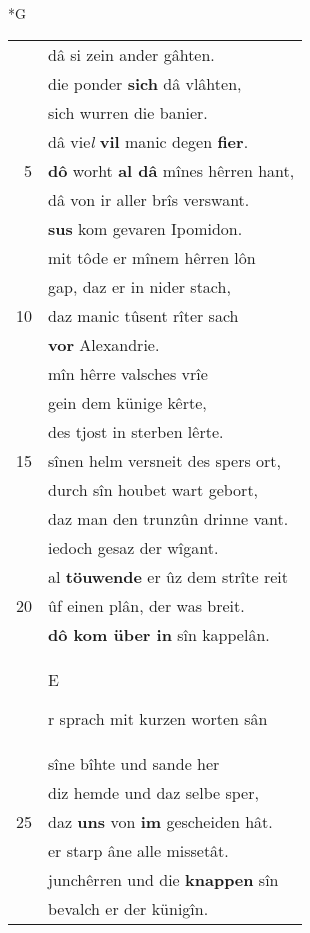 \documentclass[8pt,a4paper,notitlepage]{article}
\begin{document}
\begin{table}[ht]
\begin{minipage}[t]{0.5\linewidth}
\small
\begin{center}*G
\end{center}
\begin{tabular}{rl}
 & dâ si zein ander gâhten.\\ 
 & die ponder \textbf{sich} dâ vlâhten,\\ 
 & sich wurren die banier.\\ 
 & dâ vie\textit{l} \textbf{vil} manic degen \textbf{fier}.\\ 
5 & \textbf{dô} worht \textbf{al dâ} mînes hêrren hant,\\ 
 & dâ von ir aller brîs verswant.\\ 
 & \textbf{sus} kom gevaren Ipomidon.\\ 
 & mit tôde er mînem hêrren lôn\\ 
 & gap, daz er in nider stach,\\ 
10 & daz manic tûsent rîter sach\\ 
 & \textbf{vor} Alexandrie.\\ 
 & mîn hêrre valsches vrîe\\ 
 & gein dem künige kêrte,\\ 
 & des tjost in sterben lêrte.\\ 
15 & sînen helm versneit des spers ort,\\ 
 & durch sîn houbet wart gebort,\\ 
 & daz man den trunzûn drinne vant.\\ 
 & iedoch gesaz der wîgant.\\ 
 & al \textbf{töuwende} er ûz dem strîte reit\\ 
20 & ûf einen plân, der was breit.\\ 
 & \textbf{dô kom über in} sîn kappelân.\\ 
 & \begin{large}E\end{large}r sprach mit kurzen worten sân\\ 
 & sîne bîhte und sande her\\ 
 & diz hemde und daz selbe sper,\\ 
25 & daz \textbf{uns} von \textbf{im} gescheiden hât.\\ 
 & er starp âne alle missetât.\\ 
 & junchêrren und die \textbf{knappen} sîn\\ 
 & bevalch er der künigîn.\\ 

\end{tabular}
\end{minipage}
\end{table}
\end{document}
